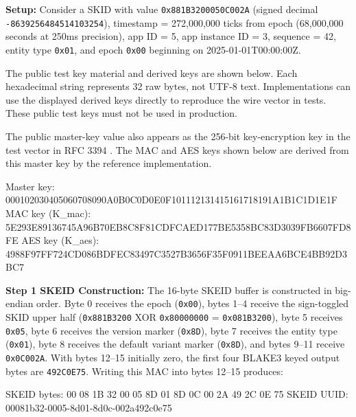 \documentclass[a4paper,fleqn]{cas-sc}
\newenvironment{Shaded}{}{}
\newcommand{\NormalTok}[1]{#1}
\begin{document}
\textbf{Setup:} Consider a SKID with value \texttt{0x881B3200050C002A}
(signed decimal \texttt{-8639256484514103254}), timestamp = 272,000,000
ticks from epoch (68,000,000 seconds at 250ms precision), app ID = 5,
app instance ID = 3, sequence = 42, entity type \texttt{0x01}, and epoch
\texttt{0x00} beginning on 2025-01-01T00:00:00Z.

The public test key material and derived keys are shown below. Each
hexadecimal string represents 32 raw bytes, not UTF-8 text.
Implementations can use the displayed derived keys directly to reproduce
the wire vector in tests. These public test keys must not be used in
production.

The public master-key value also appears as the 256-bit key-encryption
key in the test vector in RFC 3394 \citep[Section 4.3]{rfc3394}. The MAC
and AES keys shown below are derived from this master key by the
reference implementation.

\begin{Shaded}
\begin{Highlighting}[]
\NormalTok{Master key:}
\NormalTok{000102030405060708090A0B0C0D0E0F101112131415161718191A1B1C1D1E1F}
\NormalTok{MAC key (K\_mac):}
\NormalTok{5E293E89136745A96B70EB8C8F81CDFCAED177BE5358BC83D3039FB6607FD8FE}
\NormalTok{AES key (K\_aes):}
\NormalTok{4988F97FF724CD086BDFEC83497C3527B3656F35F0911BEEAA6BCE4BB92D3BC7}
\end{Highlighting}
\end{Shaded}

\textbf{Step 1 SKEID Construction:} The 16-byte SKEID buffer is
constructed in big-endian order. Byte 0 receives the epoch
(\texttt{0x00}), bytes 1--4 receive the sign-toggled SKID upper half
(\texttt{0x881B3200} XOR \texttt{0x80000000} = \texttt{0x081B3200}),
byte 5 receives \texttt{0x05}, byte 6 receives the version marker
(\texttt{0x8D}), byte 7 receives the entity type (\texttt{0x01}), byte 8
receives the default variant marker (\texttt{0x8D}), and bytes 9--11
receive \texttt{0x0C002A}. With bytes 12--15 initially zero, the first
four BLAKE3 keyed output bytes are \texttt{492C0E75}. Writing this MAC
into bytes 12--15 produces:

\begin{Shaded}
\begin{Highlighting}[]
\NormalTok{SKEID bytes: 00 08 1B 32 00 05 8D 01 8D 0C 00 2A 49 2C 0E 75}
\NormalTok{SKEID UUID:  00081b32{-}0005{-}8d01{-}8d0c{-}002a492c0e75}
\end{Highlighting}
\end{Shaded}
\end{document}
